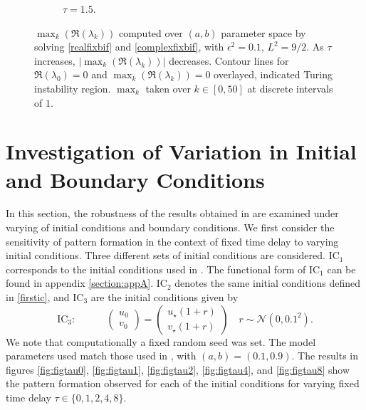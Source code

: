 \begin{figure}[H]
\begin{subfigure}[b]{0.45\textwidth}
        \caption{$\tau=1.5$.}
        \label{}
    \end{subfigure}
    \caption{$\max_k(\Re(\lambda_k))$ computed over $(a,b)$ parameter space by solving \eqref{realfixbif} and \eqref{complexfixbif}, with $\epsilon^2=0.1$, $L^2=9/2$. As $\tau$ increases, $|\max_k(\Re(\lambda_k))|$ decreases. Contour lines for $\Re(\lambda_0)=0$ and $\max_k(\Re(\lambda_k))=0$ overlayed, indicated Turing instability region. $\max_k$ taken over $k\in[0, 50]$ at discrete intervals of $1$.}
    \label{fig:fixbif2}
\end{figure}
\section{Investigation of Variation in Initial and Boundary Conditions}
In this section, the robustness of the results obtained in \cite{gaffmonk} are examined under varying of initial conditions and boundary conditions. We first consider the sensitivity of pattern formation in the context of fixed time delay to varying initial conditions. Three different sets of initial conditions are considered. $\text{IC}_1$ corresponds to the initial conditions used in \cite{gaffmonk}. The functional form of $\text{IC}_1$ can be found in appendix \ref{section:appA}. $\text{IC}_2$ denotes the same initial conditions defined in \eqref{firstic}, and $\text{IC}_3$ are the initial conditions given by
\begin{equation}\label{ic3}
\text{IC}_3:\quad\quad\quad\begin{pmatrix}u_0\\v_0\end{pmatrix}=\begin{pmatrix}u_\star(1+r)\\v_\star(1+r)\end{pmatrix}\quad r\sim\mathcal{N}\left(0,0.1^2\right).
\end{equation}
We note that computationally a fixed random seed was set. The model parameters used match those used in \cite{gaffmonk}, with $(a,b)=(0.1,0.9)$. The results in figures \ref{fig:figtau0}, \ref{fig:figtau1}, \ref{fig:figtau2}, \ref{fig:figtau4}, and \ref{fig:figtau8} show the pattern formation observed for each of the initial conditions for varying fixed time delay $\tau\in\{0,1,2,4,8 \}$.


